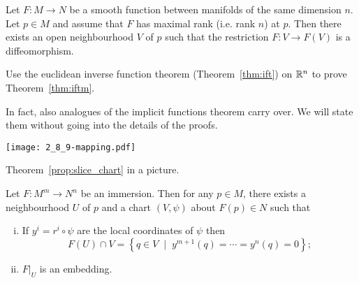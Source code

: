 \begin{theorem}\label{thm:iftm}
  Let $F:M\to N$ be a smooth function between manifolds of the same dimension $n$.
  Let $p\in M$ and assume that $F$ has maximal rank (i.e. rank $n$) at $p$.
  Then there exists an open neighbourhood $V$ of $p$ such that the restriction $F:V\to F(V)$ is a diffeomorphism.
\end{theorem}
\begin{exercise}
  Use the euclidean inverse function theorem (Theorem~\ref{thm:ift}) on $\mathbb{R}^n$ to prove Theorem~\ref{thm:iftm}.
\end{exercise}


In fact, also analogues of the implicit functions theorem carry over.
We will state them without going into the details of the proofs.

\begin{marginfigure}
  \texttt{[image: 2\_8\_9-mapping.pdf]}
  \caption{Theorem~\ref{prop:slice_chart} in a picture.}
\end{marginfigure}
\begin{proposition}\label{prop:slice_chart}
  Let $F:M^m\to N^n$ be an immersion.
  Then for any $p\in M$, there exists a neighbourhood $U$ of $p$ and a chart $(V,\psi)$ about $F(p)\in N$ such that
  \begin{enumerate}[(i)]
    \item If $y^i = r^i\circ \psi$ are the local coordinates of $\psi$ then
    \begin{equation}\label{eq:slice_chart}
      F(U)\cap V = \left\{ q \in V \;\mid\; y^{m+1}(q)=\cdots=y^n(q)=0\right\};
    \end{equation}
    \item $F\big|_U$ is an embedding.
  \end{enumerate}
 \end{proposition}

